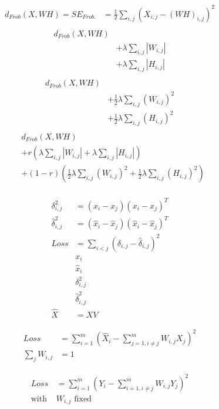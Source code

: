 \documentclass[USenglish,final,authoryear,12pt]{article}
\begin{document}
\begin{align*}
	d_{Frob}(X,WH) = SE_{Frob.} &= \frac{1}{2}\sum_{i, j}\left(X_{i,j} - (WH)_{i,j}\right)^2\\
\end{align*}
\begin{align*}
d_{Frob}(X,WH) & \\
&+ \lambda \sum_{i,j}|W_{i,j}|\\
&+ \lambda \sum_{i,j}|H_{i,j}|\\
\end{align*}
\begin{align*}
d_{Frob}(X,WH) & \\
&+ \frac{1}{2}\lambda \sum_{i,j}\left(W_{i,j}\right)^2\\
&+ \frac{1}{2}\lambda \sum_{i,j}\left(H_{i,j}\right)^2\\
\end{align*}
\begin{align*}
&d_{Frob}(X,WH) \\
&+ r \left(\lambda \sum_{i,j}|W_{i,j}|
+ \lambda \sum_{i,j}|H_{i,j}|\right)\\
&+ (1-r)\left(\frac{1}{2}\lambda \sum_{i,j}\left(W_{i,j}\right)^2
+ \frac{1}{2}\lambda \sum_{i,j}\left(H_{i,j}\right)^2\right)\\
\end{align*}

\begin{align*}
	\delta_{i,j}^2 &= (x_{i}-x_j)(x_{i}-x_j)^T\\
	\hat{\delta}_{i,j}^2 &= (\hat{x}_{i}-\hat{x}_j)(\hat{x}_{i}-\hat{x}_j)^T\\
	Loss &= \sum_{i<j}\left(\delta_{i,j}-\hat{\delta}_{i,j}\right)^2\\
	&x_i\\
	&\hat{x}_i\\
	&\delta^2_{i,j}\\
	&\hat{\delta}^2_{i,j}\\
	\hat{X} &= XV
\end{align*}

\begin{align*}
	Loss &= \sum_{i=1}^{m} \left(\hat{X}_i - \sum_{j=1, i\neq j}^{m}W_{i,j}X_{j}\right)^2\\
	\sum_{j}W_{i,j} &= 1
\end{align*}

\begin{align*}
	Loss &= \sum_{i=1}^{m}\left(Y_i - \sum_{i=1,i\neq j}^m W_{i,j}Y_j\right)^2\\
	\text{with }&W_{i,j}\text{ fixed}\\
\end{align*}
\end{document}
